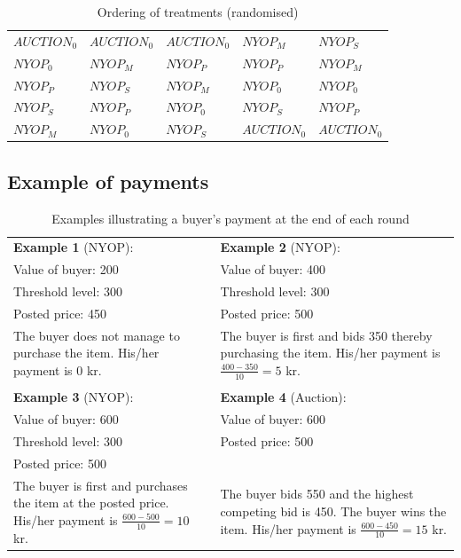 \documentclass[a4paper,12pt]{article}
\begin{document}
	\begin{table}[ht]
		\caption{Ordering of treatments (randomised)}
		\begin{tabular}{l | l | l | l | l}
			$AUCTION_0$	& $AUCTION_0$ 	& $AUCTION_0$ 	& $NYOP_M$ 		& $NYOP_S$ 	\\
			$NYOP_0$ 	& $NYOP_M$		& $NYOP_P$		& $NYOP_P$		& $NYOP_M$	\\
			$NYOP_P$ 	& $NYOP_S$		& $NYOP_M$		& $NYOP_0$		& $NYOP_0$	\\
			$NYOP_S$	& $NYOP_P$		& $NYOP_0$		& $NYOP_S$		& $NYOP_P$	\\
			$NYOP_M$	& $NYOP_0$		& $NYOP_S$		& $AUCTION_0$	& $AUCTION_0$	
		\end{tabular}
		\label{tab:order}
	\end{table}
	
	\subsection{Example of payments}
	\label{app:example_payment}

	\begin{table}[ht]
		\caption{Examples illustrating a buyer's payment at the end of each round}
		\begin{tabular}{p{}  p{}}
			{\bf Example 1} (NYOP): 	& {\bf Example 2} (NYOP):  		\\
			Value of buyer: 200 		& Value of buyer: 400 			\\
			Threshold level: 300 		& Threshold level: 300 			\\
			Posted price: 450 			& Posted price: 500 			\\
			The buyer does not manage to purchase the item. His/her payment is 0 kr. & The buyer is first and bids 350 thereby purchasing the item. His/her payment is $\frac{400-350}{10}=5$ kr. \\
			\multicolumn{2}{c}{} \\
			{\bf Example 3} (NYOP):  	& {\bf Example 4} (Auction): 	\\
			Value of buyer: 600 		& Value of buyer: 600  			\\
			Threshold level: 300  		& Posted price: 500  			\\
			Posted price: 500  			&  								\\
			The buyer is first and purchases the item at the posted price. His/her payment is $\frac{600-500}{10}=10$ kr. & The buyer bids 550 and the highest competing bid is 450. The buyer wins the item. His/her payment is $\frac{600-450}{10}=15$ kr. \\
		\end{tabular}
		\label{tab:payment}
	\end{table}
\end{document}
